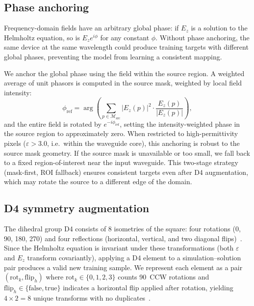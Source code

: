 \subsection{Phase anchoring}

Frequency-domain fields have an arbitrary global phase: if $E_z$ is a solution to the Helmholtz equation, so is
$E_z e^{i\phi}$ for any constant $\phi$. Without phase anchoring, the same device at the same wavelength could produce
training targets with different global phases, preventing the model from learning a consistent mapping.

We anchor the global phase using the field within the source region. A weighted average of unit phasors is computed in
the source mask, weighted by local field intensity:
\begin{equation}
    \phi_\text{ref} = \arg\!\left(\sum_{p \in \mathcal{M}_\text{src}} |E_z(p)|^2 \cdot
    \frac{E_z(p)}{|E_z(p)|}\right),
    \label{eq:phase_anchor}
\end{equation}
and the entire field is rotated by $e^{-i\phi_\text{ref}}$, setting the intensity-weighted phase in the source region
to approximately zero. When restricted to high-permittivity pixels ($\varepsilon > 3.0$, i.e.\ within the waveguide
core), this anchoring is robust to the source mask geometry. If the source mask is unavailable or too small, we fall
back to a fixed region-of-interest near the input waveguide. This two-stage strategy (mask-first, ROI fallback)
ensures consistent targets even after D4 augmentation, which may rotate the source to a different edge of the domain.

\subsection{D4 symmetry augmentation}

The dihedral group D4 consists of 8 isometries of the square: four rotations (0\textdegree, 90\textdegree,
180\textdegree, 270\textdegree) and four reflections (horizontal, vertical, and two diagonal
flips)~\cite{Cohen2016GroupEquivariant}. Since the Helmholtz equation is invariant under these transformations (both
$\varepsilon$ and $E_z$ transform covariantly), applying a D4 element to a simulation--solution pair produces a valid
new training sample. We represent each element as a pair $(\text{rot}_k, \text{flip}_h)$ where $\text{rot}_k \in
\{0,1,2,3\}$ counts 90\textdegree\ CCW rotations and $\text{flip}_h \in \{\text{false}, \text{true}\}$ indicates a
horizontal flip applied after rotation, yielding $4 \times 2 = 8$ unique transforms with no
duplicates~\cite{Brandstetter2022LieSymmetry}.

